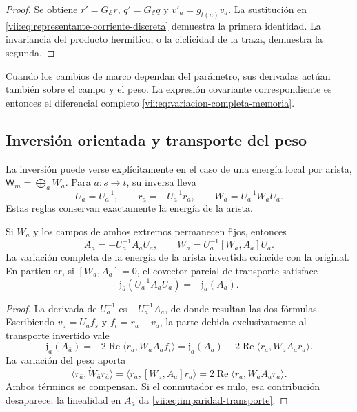 \begin{proof}
Se obtiene \(r'=G_{\mathcal E}r\), \(q'=G_{\mathcal E}q\) y
\(v'_a=g_{t(a)}v_a\). La sustitución en
\eqref{vii:eq:representante-corriente-discreta} demuestra la primera
identidad. La invariancia del producto hermítico, o la ciclicidad de
la traza, demuestra la segunda.
\end{proof}

Cuando los cambios de marco dependan del parámetro, sus derivadas
actúan también sobre el campo y el peso. La expresión covariante
correspondiente es entonces el diferencial completo
\eqref{vii:eq:variacion-completa-memoria}.

\subsection{Inversión orientada y transporte del peso}
\label{vii:subsec:inversion-respuesta}

La inversión puede verse explícitamente en el caso de una energía
local por arista, \(\mathsf W_m=\bigoplus_a W_a\).
Para \(a:s\to t\), su inversa lleva
\[
 U_{\bar a}=U_a^{-1},\qquad
 r_{\bar a}=-U_a^{-1}r_a,\qquad
 W_{\bar a}=U_a^{-1}W_aU_a.
\]
Estas reglas conservan exactamente la energía de la arista.

\begin{proposition}
\label{vii:prop:inversion-respuesta}
Si \(W_a\) y los campos de ambos extremos permanecen fijos, entonces
\[
 A_{\bar a}=-U_a^{-1}A_aU_a,\qquad
 \dot W_{\bar a}=U_a^{-1}[W_a,A_a]U_a.
\]
La variación completa de la energía de la arista invertida coincide con
la original. En particular, si \([W_a,A_a]=0\), el covector parcial
de transporte satisface
\begin{equation}
 \mathfrak j_{\bar a}(U_a^{-1}A_aU_a)
 =-\mathfrak j_a(A_a).
 \label{vii:eq:imparidad-transporte}
\end{equation}
\end{proposition}

\begin{proof}
La derivada de \(U_a^{-1}\) es \(-U_a^{-1}A_a\), de donde resultan
las dos fórmulas. Escribiendo \(v_a=U_af_s\) y \(f_t=r_a+v_a\),
la parte debida exclusivamente al transporte invertido vale
\[
 \mathfrak j_{\bar a}(A_{\bar a})
 =-2\operatorname{Re}\langle r_a,W_aA_af_t\rangle
 =\mathfrak j_a(A_a)
   -2\operatorname{Re}\langle r_a,W_aA_ar_a\rangle.
\]
La variación del peso aporta
\[
 \langle r_{\bar a},\dot W_{\bar a}r_{\bar a}\rangle
 =\langle r_a,[W_a,A_a]r_a\rangle
 =2\operatorname{Re}\langle r_a,W_aA_ar_a\rangle.
\]
Ambos términos se compensan. Si el conmutador es nulo, esa contribución
desaparece; la linealidad en \(A_a\) da
\eqref{vii:eq:imparidad-transporte}.
\end{proof}

